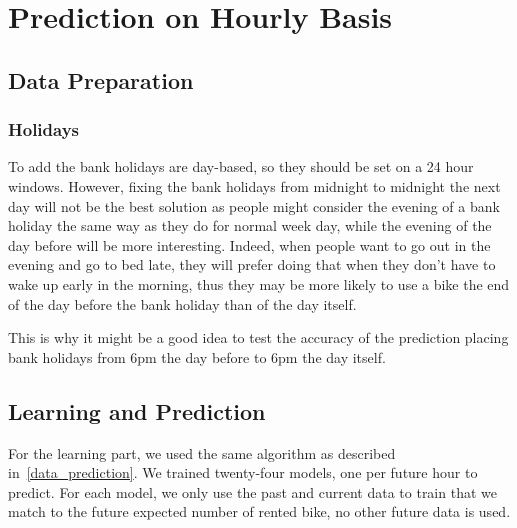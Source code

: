 
\section{Prediction on Hourly Basis}

\subsection{Data Preparation}


\subsubsection{Holidays}

To add the bank holidays are day-based, so they should be set on a 24 hour windows.
However, fixing the bank holidays from midnight to midnight the next day will not
be the best solution as people might consider the evening of a bank holiday the same
way as they do for normal week day, while the evening of the day before will be more
interesting. Indeed, when people want to go out in the evening and go to bed late,
they will prefer doing that when they don't have to wake up early in the morning,
thus they may be more likely to use a bike the end of the day before the bank
holiday than of the day itself.

This is why it might be a good idea to test the accuracy of the prediction
placing bank holidays from 6pm the day before to 6pm the day itself.


\subsection{Learning and Prediction}

For the learning part, we used the same algorithm as described in~\ref{data_prediction}.
We trained twenty-four models, one per future hour to predict.
For each model, we only use the past and current data to train that we match to
the future expected number of rented bike, no other future data is used.

